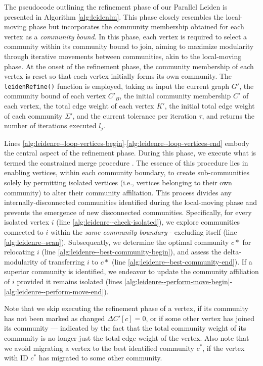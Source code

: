 The pseudocode outlining the refinement phase of our Parallel Leiden is presented in Algorithm \ref{alg:leidenlm}. This phase closely resembles the local-moving phase but incorporates the community membership obtained for each vertex as a \textit{community bound}. In this phase, each vertex is required to select a community within its community bound to join, aiming to maximize modularity through iterative movements between communities, akin to the local-moving phase. At the onset of the refinement phase, the community membership of each vertex is reset so that each vertex initially forms its own community. The \texttt{leidenRefine()} function is employed, taking as input the current graph $G'$, the community bound of each vertex $C'_B$, the initial community membership $C'$ of each vertex, the total edge weight of each vertex $K'$, the initial total edge weight of each community $\Sigma'$, and the current tolerance per iteration $\tau$, and returns the number of iterations executed $l_j$.



Lines \ref{alg:leidenre--loop-vertices-begin}-\ref{alg:leidenre--loop-vertices-end} embody the central aspect of the refinement phase. During this phase, we execute what is termed the constrained merge procedure \cite{com-traag19}. The essence of this procedure lies in enabling vertices, within each community boundary, to create sub-communities solely by permitting isolated vertices (i.e., vertices belonging to their own community) to alter their community affiliation. This process divides any internally-disconnected communities identified during the local-moving phase and prevents the emergence of new disconnected communities. Specifically, for every isolated vertex $i$ (line \ref{alg:leidenre--check-isolated}), we explore communities connected to $i$ within the \textit{same community boundary} - excluding itself (line \ref{alg:leidenre--scan}). Subsequently, we determine the optimal community $c*$ for relocating $i$ (line \ref{alg:leidenre--best-community-begin}), and assess the delta-modularity of transferring $i$ to $c*$ (line \ref{alg:leidenre--best-community-end}). If a superior community is identified, we endeavor to update the community affiliation of $i$ provided it remains isolated (lines \ref{alg:leidenre--perform-move-begin}-\ref{alg:leidenre--perform-move-end}).

Note that we skip executing the refinement phase of a vertex, if its community has not been marked as changed $\Delta C'[c] = 0$, or if some other vertex has joined its community --- indicated by the fact that the total community weight of its community is no longer just the total edge weight of the vertex. Also note that we avoid migrating a vertex to the best identified community $c^*$, if the vertex with ID $c^*$ has migrated to some other community.


